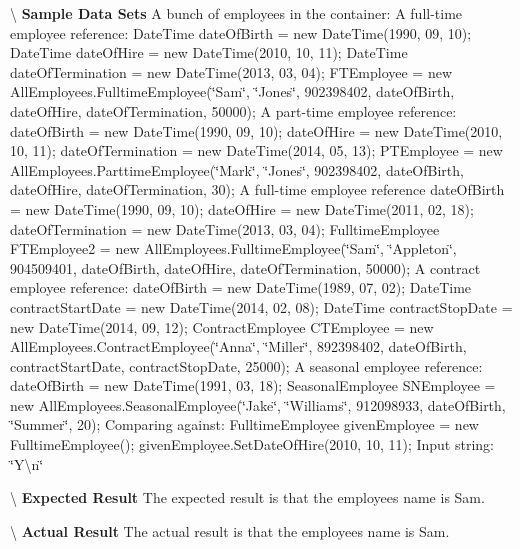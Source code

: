 \textbackslash{} {\bfseries  Sample Data Sets} A bunch of employees in the container\+: A full-\/time employee reference\+: Date\+Time date\+Of\+Birth = new Date\+Time(1990, 09, 10); Date\+Time date\+Of\+Hire = new Date\+Time(2010, 10, 11); Date\+Time date\+Of\+Termination = new Date\+Time(2013, 03, 04); F\+T\+Employee = new All\+Employees.\+Fulltime\+Employee(\char`\"{}\+Sam\char`\"{}, \char`\"{}\+Jones\char`\"{}, 902398402, date\+Of\+Birth, date\+Of\+Hire, date\+Of\+Termination, 50000); A part-\/time employee reference\+: date\+Of\+Birth = new Date\+Time(1990, 09, 10); date\+Of\+Hire = new Date\+Time(2010, 10, 11); date\+Of\+Termination = new Date\+Time(2014, 05, 13); P\+T\+Employee = new All\+Employees.\+Parttime\+Employee(\char`\"{}\+Mark\char`\"{}, \char`\"{}\+Jones\char`\"{}, 902398402, date\+Of\+Birth, date\+Of\+Hire, date\+Of\+Termination, 30); A full-\/time employee reference date\+Of\+Birth = new Date\+Time(1990, 09, 10); date\+Of\+Hire = new Date\+Time(2011, 02, 18); date\+Of\+Termination = new Date\+Time(2013, 03, 04); Fulltime\+Employee F\+T\+Employee2 = new All\+Employees.\+Fulltime\+Employee(\char`\"{}\+Sam\char`\"{}, \char`\"{}\+Appleton\char`\"{}, 904509401, date\+Of\+Birth, date\+Of\+Hire, date\+Of\+Termination, 50000); A contract employee reference\+: date\+Of\+Birth = new Date\+Time(1989, 07, 02); Date\+Time contract\+Start\+Date = new Date\+Time(2014, 02, 08); Date\+Time contract\+Stop\+Date = new Date\+Time(2014, 09, 12); Contract\+Employee C\+T\+Employee = new All\+Employees.\+Contract\+Employee(\char`\"{}\+Anna\char`\"{}, \char`\"{}\+Miller\char`\"{}, 892398402, date\+Of\+Birth, contract\+Start\+Date, contract\+Stop\+Date, 25000); A seasonal employee reference\+: date\+Of\+Birth = new Date\+Time(1991, 03, 18); Seasonal\+Employee S\+N\+Employee = new All\+Employees.\+Seasonal\+Employee(\char`\"{}\+Jake\char`\"{}, \char`\"{}\+Williams\char`\"{}, 912098933, date\+Of\+Birth, \char`\"{}\+Summer\char`\"{}, 20); Comparing against\+: Fulltime\+Employee given\+Employee = new Fulltime\+Employee(); given\+Employee.\+Set\+Date\+Of\+Hire(2010, 10, 11); Input string\+: \char`\"{}\+Y\textbackslash{}n\char`\"{}

\textbackslash{} {\bfseries  Expected Result} The expected result is that the employee\textquotesingle{}s name is Sam.

\textbackslash{} {\bfseries  Actual Result} The actual result is that the employee\textquotesingle{}s name is Sam. \hypertarget{class_the_company_1_1_tests_1_1_select_employee_tests_a5f4abc7c93c20f1e73cd5c9a673745b4}{}
